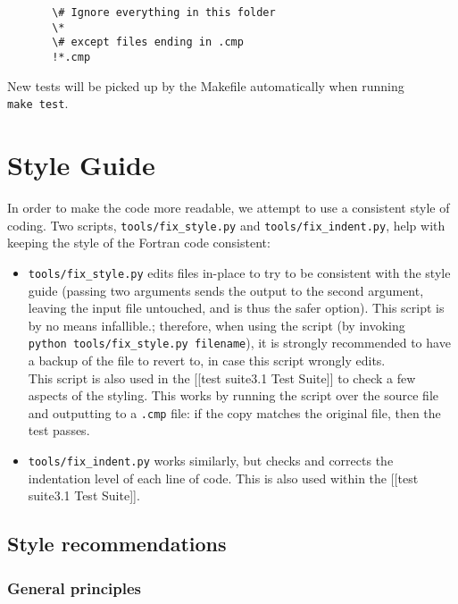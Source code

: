 \begin{verbatim}
       \# Ignore everything in this folder
       \*
       \# except files ending in .cmp
       !*.cmp
\end{verbatim}

New tests will be picked up by the Makefile automatically when running
\texttt{make\ test}.

\section{Style Guide} \label{sec:style}

In order to make the code more readable, we attempt to use a consistent
style of coding. Two scripts, \texttt{tools/fix\_style.py} and
\texttt{tools/fix\_indent.py}, help with keeping the style of the
Fortran code consistent:

\begin{itemize}
\item
  \texttt{tools/fix\_style.py} edits files in-place to try to be
  consistent with the style guide (passing two arguments sends the
  output to the second argument, leaving the input file untouched, and
  is thus the safer option). This script is by no means infallible.;
  therefore, when using the script (by invoking
  \texttt{python\ tools/fix\_style.py\ filename}), it is strongly
  recommended to have a backup of the file to revert to, in case this
  script wrongly edits.\\
  This script is also used in the {[}{[}test suite\textbar{}3.1 Test
  Suite{]}{]} to check a few aspects of the styling. This works by
  running the script over the source file and outputting to a
  \texttt{.cmp} file: if the copy matches the original file, then the
  test passes.
\item
  \texttt{tools/fix\_indent.py} works similarly, but checks and corrects
  the indentation level of each line of code. This is also used within
  the {[}{[}test suite\textbar{}3.1 Test Suite{]}{]}.
\end{itemize}

\subsection{Style recommendations} \label{subsec:style-recommendations}

\subsubsection{General principles} \label{general-principles}

